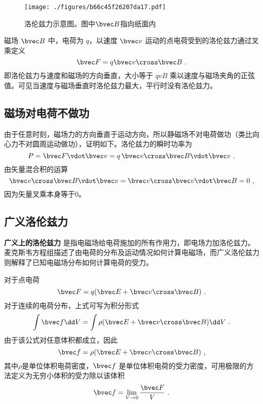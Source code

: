 
\begin{figure}[ht]
\centering
\texttt{[image: ./figures/b66c45f26207da17.pdf]}
\caption{洛伦兹力示意图。图中$\bvec B$指向纸面内} \label{fig_Lorenz_1}
\end{figure}
磁场 $\bvec B$ 中，电荷为 $q$，以速度 $\bvec v$ 运动的点电荷受到的洛伦兹力通过叉乘定义
\begin{equation}\label{eq_Lorenz_1}
\bvec F = q\bvec v \cross \bvec B~.
\end{equation}
即洛伦兹力与速度和磁场的方向垂直，大小等于 $qvB$ 乘以速度与磁场夹角的正弦值。可见当速度与磁场垂直时洛伦兹力最大，平行时没有洛伦兹力。

\subsection{磁场对电荷不做功}
由于任意时刻，磁场力的方向垂直于运动方向，所以静磁场不对电荷做功（类比向心力不对圆周运动做功），证明如下。洛伦兹力的瞬时功率为
\begin{equation}
P = \bvec F \vdot \bvec v = q\,\bvec v \cross \bvec B \vdot \bvec v~.
\end{equation}
由矢量混合积的运算
\begin{equation}
\bvec v \cross \bvec B \vdot \bvec v = \bvec v \cross \bvec v \vdot \bvec B = 0~,
\end{equation}
因为矢量叉乘本身等于0。


\subsection{广义洛伦兹力}
\textbf{广义上的洛伦兹力} 是指电磁场给电荷施加的所有作用力，即电场力加洛伦兹力。麦克斯韦方程组描述了由电荷的分布及运动情况如何计算电磁场，而广义洛伦兹力则解释了已知电磁场分布如何计算电荷的受力。

对于点电荷
\begin{equation}\label{eq_Lorenz_2}
\bvec F = q (\bvec E + \bvec v \cross \bvec B)~.
\end{equation}
对于连续的电荷分布，上式可写为积分形式
\begin{equation}
\int \bvec f \dd V= \int \rho(\bvec E + \bvec v \cross \bvec B) \dd V~.
\end{equation}
由于该公式对任意体积都成立，因此
\begin{equation}
\bvec f = \rho(\bvec E + \bvec v \cross \bvec B)~,
\end{equation}
其中$\rho$是单位体积电荷密度，$\bvec f$ 是单位体积电荷的受力密度，可用极限的方法定义为无穷小体积的受力除以该体积
\begin{equation}
\bvec f = \lim_{V \to 0} \frac{\bvec F}{V}~.
\end{equation}

